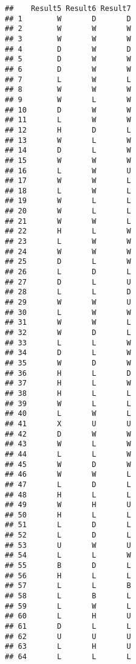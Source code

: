 \documentclass[
]{article}
\begin{document}
\begin{verbatim}
##    Result5 Result6 Result7
## 1        W       D       D
## 2        W       W       W
## 3        W       W       W
## 4        D       W       D
## 5        D       W       W
## 6        D       W       W
## 7        L       W       L
## 8        W       W       W
## 9        W       L       W
## 10       D       W       W
## 11       L       W       W
## 12       H       D       L
## 13       W       L       W
## 14       D       L       W
## 15       W       W       W
## 16       L       W       U
## 17       W       W       L
## 18       L       W       L
## 19       W       L       L
## 20       W       L       L
## 21       W       W       L
## 22       H       L       W
## 23       L       W       W
## 24       W       W       W
## 25       D       L       W
## 26       L       D       L
## 27       D       L       U
## 28       L       L       D
## 29       W       W       U
## 30       L       W       W
## 31       W       W       L
## 32       W       D       L
## 33       L       L       W
## 34       D       L       W
## 35       W       D       W
## 36       H       L       D
## 37       H       L       W
## 38       H       L       L
## 39       W       L       L
## 40       L       W       L
## 41       X       U       U
## 42       D       W       W
## 43       W       L       W
## 44       L       L       W
## 45       W       D       W
## 46       W       W       L
## 47       L       D       L
## 48       H       L       L
## 49       W       H       U
## 50       H       L       L
## 51       L       D       L
## 52       L       D       L
## 53       U       W       U
## 54       L       L       W
## 55       B       D       L
## 56       H       L       L
## 57       L       L       B
## 58       L       B       L
## 59       L       W       L
## 60       L       H       U
## 61       D       L       L
## 62       U       U       U
## 63       L       H       U
## 64       L       L       L
\end{verbatim}
\end{document}
